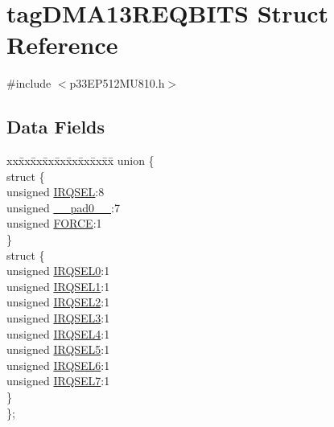 \hypertarget{structtag_d_m_a13_r_e_q_b_i_t_s}{}\section{tag\+D\+M\+A13\+R\+E\+Q\+B\+I\+TS Struct Reference}
\label{structtag_d_m_a13_r_e_q_b_i_t_s}


{\ttfamily \#include $<$p33\+E\+P512\+M\+U810.\+h$>$}

\subsection*{Data Fields}
\begin{DoxyCompactItemize}
\item 
\begin{tabbing}
xx\=xx\=xx\=xx\=xx\=xx\=xx\=xx\=xx\=\kill
union \{\\
\>struct \{\\
\>\>unsigned \hyperlink{structtag_d_m_a13_r_e_q_b_i_t_s_a5e70ba01366ab2f37371d52661dd93b2}{IRQSEL}:8\\
\>\>unsigned \hyperlink{structtag_d_m_a13_r_e_q_b_i_t_s_adf71f3d8410c1f1dbbc96680a92c49af}{\_\_pad0\_\_}:7\\
\>\>unsigned \hyperlink{structtag_d_m_a13_r_e_q_b_i_t_s_a9b378a7ffc1ab4bc4a3710fb36389180}{FORCE}:1\\
\>\} \\
\>struct \{\\
\>\>unsigned \hyperlink{structtag_d_m_a13_r_e_q_b_i_t_s_ac73241b8f783760c9192dfd8a0773cad}{IRQSEL0}:1\\
\>\>unsigned \hyperlink{structtag_d_m_a13_r_e_q_b_i_t_s_a45e1f083e5a8a59f25acc35910732426}{IRQSEL1}:1\\
\>\>unsigned \hyperlink{structtag_d_m_a13_r_e_q_b_i_t_s_a60dda7474727b3624ca25fa0067a8924}{IRQSEL2}:1\\
\>\>unsigned \hyperlink{structtag_d_m_a13_r_e_q_b_i_t_s_aeaafe1b8c89398ed382054ab628aed78}{IRQSEL3}:1\\
\>\>unsigned \hyperlink{structtag_d_m_a13_r_e_q_b_i_t_s_a91c4162e0f3d4ac7adcdb49302f19840}{IRQSEL4}:1\\
\>\>unsigned \hyperlink{structtag_d_m_a13_r_e_q_b_i_t_s_a6382d50430464cf20b3dee3dbf2e8c01}{IRQSEL5}:1\\
\>\>unsigned \hyperlink{structtag_d_m_a13_r_e_q_b_i_t_s_ace52408ef8c29561f3c56a3fbcbc8217}{IRQSEL6}:1\\
\>\>unsigned \hyperlink{structtag_d_m_a13_r_e_q_b_i_t_s_acce7dedecdf1f53cdbead3edf7c5d53a}{IRQSEL7}:1\\
\>\} \\
\}; \\

\end{tabbing}\end{DoxyCompactItemize}


